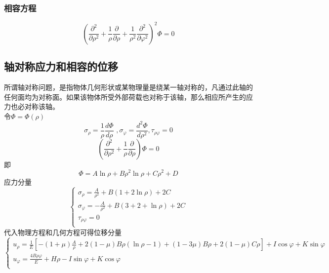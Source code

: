 \subsubsection{相容方程}
\begin{equation}
\left( \frac{\partial ^2}{\partial \rho ^2}+\frac{1}{\rho}\frac{\partial}{\partial \rho}+\frac{1}{\rho ^2}\frac{\partial ^2}{\partial \varphi ^2} \right)^2 \varPhi =0
\end{equation}
\subsection{轴对称应力和相容的位移}
所谓轴对称问题，是指物体几何形状或某物理量是绕某一轴对称的，凡通过此轴的任何面均为对称面。如果该物体所受外部荷载也对称于该轴，那么相应所产生的应力也必对称该轴。
\\
令$\varPhi =\varPhi \left( \rho \right) $
\begin{equation}
\sigma _{\rho}=\frac{1}{\rho}\frac{d\varPhi}{d\rho}\,\,,     \sigma _{\varphi}=\frac{d^2\varPhi}{d\rho ^2},     \tau _{\rho \varphi}=0
\end{equation}
\begin{equation}
\left( \frac{\partial ^2}{\partial \rho ^2}+\frac{1}{\rho}\frac{\partial}{\partial \rho} \right) \varPhi =0
\end{equation}
即
\begin{equation}
\varPhi =A\ln \rho +B\rho ^2\ln \rho +C\rho ^2+D
\end{equation}
应力分量
\begin{equation}
\begin{cases}
\sigma _{\rho}=\frac{A}{\rho ^2}+B\left( 1+2\ln \rho \right) +2C\\
\sigma _{\varphi}=-\frac{A}{\rho ^2}+B\left( 3+2+\ln \rho \right) +2C\\
\tau _{\rho \varphi}=0\\
\end{cases}
\end{equation}
代入物理方程和几何方程可得位移分量
\begin{equation}
\begin{cases}
u_{\rho}=\frac{1}{E}\left[ -\left( 1+\mu \right) \frac{A}{\rho}+2\left( 1-\mu \right) B\rho \left( \ln \rho -1 \right) +\left( 1-3\mu \right) B\rho +2\left( 1-\mu \right) C\rho \right] +I\cos \varphi +K\sin \varphi\\
u_{\varphi}=\frac{4B\rho \varphi}{E}+H\rho -I\sin \varphi +K\cos \varphi\\
\end{cases}
\end{equation}
